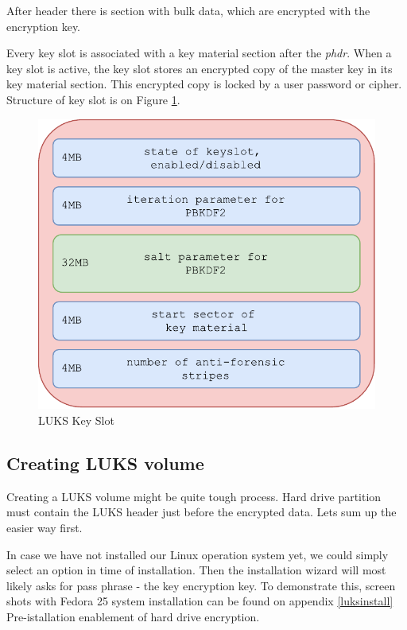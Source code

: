 After header there is section with bulk data, which are encrypted with the encryption key.

Every key slot is associated with a key material section after the {\it phdr}.
When a key slot is active, the key slot stores an encrypted copy of the master key in its key material section.
This encrypted copy is locked by a user password or cipher.
Structure of key slot is on Figure \ref{fig:luksslot}.

\begin{figure}[h]
    \centering
    \includegraphics[scale=0.6]{figures/LUKSkeyslot.pdf}
    \caption{LUKS Key Slot}
    \label{fig:luksslot}
\end{figure}


\subsection{Creating LUKS volume}

Creating a LUKS volume might be quite tough process.
Hard drive partition must contain the LUKS header just before the encrypted data.
Lets sum up the easier way first.

In case we have not installed our Linux operation system yet, we could simply select an option in time of installation.
Then the installation wizard will most likely asks for pass phrase - the key encryption key.
To demonstrate this, screen shots with Fedora 25 system installation can be found on appendix \ref{luksinstall} Pre-istallation enablement of hard drive encryption.


